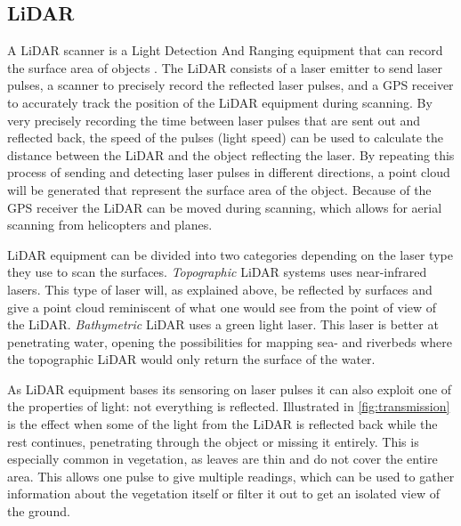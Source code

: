     \subsection{LiDAR}
        A LiDAR scanner is a Light Detection And Ranging equipment that can record the surface area of objects \cite{lidar}. The LiDAR consists of a laser emitter to send laser pulses, a scanner to precisely record the reflected laser pulses, and a GPS receiver to accurately track the position of the LiDAR equipment during scanning. By very precisely recording the time between laser pulses that are sent out and reflected back, the speed of the pulses (light speed) can be used to calculate the distance between the LiDAR and the object reflecting the laser. By repeating this process of sending and detecting laser pulses in different directions, a point cloud will be generated that represent the surface area of the object. Because of the GPS receiver the LiDAR can be moved during scanning, which allows for aerial scanning from helicopters and planes.
        
        LiDAR equipment can be divided into two categories depending on the laser type they use to scan the surfaces. \emph{Topographic} LiDAR systems uses near-infrared lasers. This type of laser will, as explained above, be reflected by surfaces and give a point cloud reminiscent of what one would see from the point of view of the LiDAR. \emph{Bathymetric} LiDAR uses a green light laser. This laser is better at penetrating water, opening the possibilities for mapping sea- and riverbeds where the topographic LiDAR would only return the surface of the water.
        
        As LiDAR equipment bases its sensoring on laser pulses it can also exploit one of the properties of light: not everything is reflected\cite{lidar_canopy}. Illustrated in \cref{fig:transmission} is the effect when some of the light from the LiDAR is reflected back while the rest continues, penetrating through the object or missing it entirely. This is especially common in vegetation, as leaves are thin and do not cover the entire area. This allows one pulse to give multiple readings, which can be used to gather information about the vegetation itself or filter it out to get an isolated view of the ground.
        
